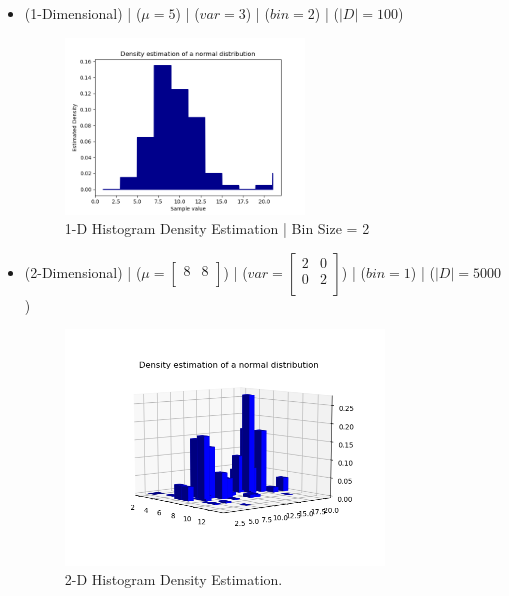 \documentclass[12pt]{article}
\numberwithin{equation}{section}
\numberwithin{table}{section}
\numberwithin{figure}{section}
\begin{document}
\begin{itemize}
	\item (1-Dimensional) | ($\mu = 5$) | ($var = 3$) | ($bin = 2$) | ($|D| = 100$)
	\begin{figure}[!h]\centering
		\includegraphics[width=0.6\textwidth]{3_a_1.PNG}
		\caption{1-D Histogram Density Estimation | Bin Size = 2}
		\label{pl1}
	\end{figure}
	
	\item (2-Dimensional) | ($\mu = 	\begin{bmatrix}
	8 & 8\\
	\end{bmatrix}$) | ($var = 	\begin{bmatrix}
	2 & 0\\
	0 & 2\\
	\end{bmatrix}$) | ($bin = 1$) | ($|D| = 5000$)
	\begin{figure}[!h]\centering
		\includegraphics[width=0.8\textwidth]{3_a_2.PNG}
		\caption{2-D Histogram Density Estimation.}
		\label{pl1}
	\end{figure}
	
\end{itemize}
\end{document}
